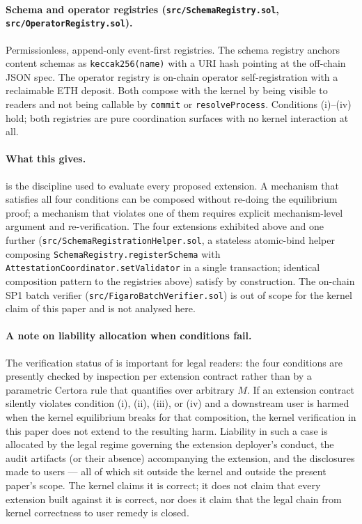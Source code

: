 \documentclass[11pt,a4paper]{article}
\theoremstyle{definition}
\theoremstyle{remark}
\begin{document}
\paragraph{Schema and operator registries (\texttt{src/SchemaRegistry.sol}, \texttt{src/OperatorRegistry.sol}).}
Permissionless, append-only event-first registries. The schema
registry anchors content schemas as \texttt{keccak256(name)} with a
URI hash pointing at the off-chain JSON spec. The operator registry
is on-chain operator self-registration with a reclaimable ETH
deposit. Both compose with the kernel by being visible to readers
and not being callable by \texttt{commit} or
\texttt{resolveProcess}. Conditions (i)--(iv) hold; both registries
are pure coordination surfaces with no kernel interaction at all.

\paragraph{What this gives.}
 is the discipline used to evaluate every
proposed extension. A mechanism that satisfies all four conditions
can be composed without re-doing the equilibrium proof; a mechanism
that violates one of them requires explicit mechanism-level argument
and re-verification. The four extensions exhibited above and one
further (\texttt{src/SchemaRegistrationHelper.sol}, a stateless
atomic-bind helper composing \texttt{SchemaRegistry.registerSchema}
with \texttt{AttestationCoordinator.setValidator} in a single
transaction; identical composition pattern to the registries above)
satisfy  by construction. The on-chain SP1
batch verifier (\texttt{src/FigaroBatchVerifier.sol}) is out of scope
for the kernel claim of this paper and is not analysed here.

\paragraph{A note on liability allocation when conditions fail.}
The verification status of  is important
for legal readers: the four conditions are presently checked by
inspection per extension contract rather than by a parametric
Certora rule that quantifies over arbitrary $M$.
If an extension contract silently violates condition (i), (ii),
(iii), or (iv) and a downstream user is harmed when the kernel
equilibrium breaks for that composition, the kernel verification
in this paper does not extend to the resulting harm. Liability in
such a case is allocated by the legal regime governing the
extension deployer's conduct, the audit artifacts (or their
absence) accompanying the extension, and the disclosures made to
users --- all of which sit outside the kernel and outside the
present paper's scope. The kernel claims it is correct; it does
not claim that every extension built against it is correct, nor
does it claim that the legal chain from kernel correctness to
user remedy is closed.
\end{document}
